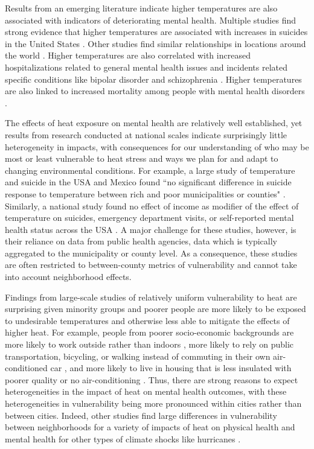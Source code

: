 \documentclass[fleqn,10pt]{wlscirep}
\begin{document}
Results from an emerging literature indicate higher temperatures are also associated with indicators of deteriorating mental health.  Multiple studies find strong evidence that higher temperatures are associated with increases in suicides in the United States \cite{Burke2018Aug, Mullins2019Dec, Dixon2007May}. Other studies find similar relationships in locations around the world \cite{Qi2014Dec, Page2007Aug, Likhvar2011Jan}. Higher temperatures are also correlated with increased hospitalizations related to general mental health issues \cite{Obradovich2018Oct, Mullins2019Dec} and incidents related specific conditions like bipolar disorder and schizophrenia \cite{Lee2007Jan, Sung2013Feb}. Higher temperatures are also linked to increased mortality among people with mental health disorders \cite{Hansen2008Oct}.

The effects of heat exposure on mental health are relatively well established, yet results from research conducted at national scales indicate surprisingly little heterogeneity in impacts, with consequences for our understanding of who may be most or least vulnerable to heat stress and ways we plan for and adapt to changing environmental conditions. For example, a large study of temperature and suicide in the USA and Mexico found ``no significant difference in suicide response to temperature between rich and poor municipalities or counties" \cite{Burke2018Aug}. Similarly, a national study found no effect of income as modifier of the effect of temperature on suicides, emergency department visits, or self-reported mental health status across the USA \cite{Mullins2019Dec}. A major challenge for these studies, however, is their reliance on data from public health agencies, data which is typically aggregated to the municipality or county level.  As a consequence, these studies are often restricted to between-county metrics of vulnerability and cannot take into account neighborhood effects.

Findings from large-scale studies of relatively uniform vulnerability to heat are surprising given minority groups and poorer people are more likely to be exposed to undesirable temperatures and otherwise less able to mitigate the effects of higher heat. For example, people from poorer socio-economic backgrounds are more likely to work outside rather than indoors \cite{Gubernot2014Oct}, more likely to rely on public transportation, bicycling, or walking instead of commuting in their own air-conditioned car \cite{Karner2015Dec}, and more likely to live in housing that is less insulated with poorer quality or no air-conditioning \cite{Samuelson2020Jun}. Thus, there are strong reasons to expect heterogeneities in the impact of heat on mental health outcomes, with these heterogeneities in vulnerability being more pronounced within cities rather than between cities. Indeed, other studies find large differences in vulnerability between neighborhoods for a variety of impacts of heat on physical health  \cite{Belanger2015Mar, Uejio2011Mar} and mental health for other types of climate shocks like hurricanes \cite{ferre2019hurricane, Gruebner2015Jun}.
\end{document}
